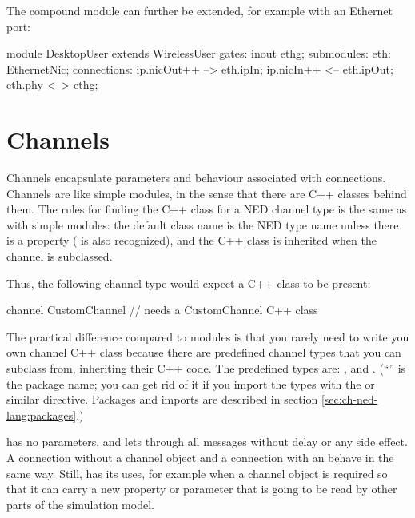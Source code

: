 The  compound module can further be extended,
for example with an Ethernet port:

\begin{ned}
module DesktopUser extends WirelessUser
{
   gates:
       inout ethg;
   submodules:
       eth: EthernetNic;
   connections:
       ip.nicOut++ --> eth.ipIn;
       ip.nicIn++ <-- eth.ipOut;
       eth.phy <--> ethg;
}
\end{ned}



\section{Channels}
\label{sec:ch-ned-lang:channels}

Channels encapsulate parameters and behaviour associated with connections.
Channels are like simple modules, in the sense that there are C++ classes
behind them. The rules for finding the C++ class for a NED channel type is
the same as with simple modules: the default class name is the NED type
name unless there is a  property ( is also
recognized), and the C++ class is inherited when the channel is subclassed.

Thus, the following channel type would expect a  C++ class
to be present:

\begin{ned}
channel CustomChannel  // needs a CustomChannel C++ class
{
}
\end{ned}

The practical difference compared to modules is that you rarely need to write you own
channel C++ class because there are predefined channel types that you can
subclass from, inheriting their C++ code. The predefined types are:
,  and .
(``'' is the package name; you can get rid of it if you import the types
with the  or similar directive. Packages and imports
are described in section \ref{sec:ch-ned-lang:packages}.)

 has no parameters, and lets through all messages without
delay or any side effect. A connection without a channel object
and a connection with an  behave in the same way.
Still,  has its uses, for example when a channel object
is required so that it can carry a new property or parameter that is
going to be read by other parts of the simulation model.

